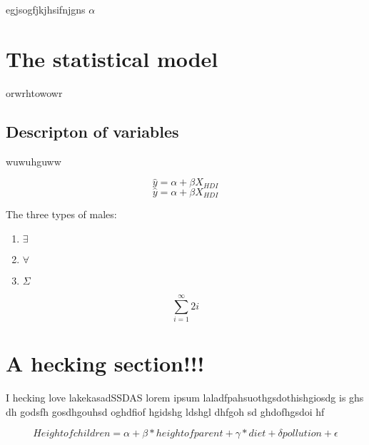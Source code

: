 \documentclass{article}
\begin{document}
egjsogfjkjhsifnjgns $\alpha$

\section{The statistical model}
orwrhtowowr
\subsection{Descripton of variables}
wuwuhguww

\begin{equation}
    \hat{y} = \alpha + \beta X_{HDI}
\end{equation}
$$\hat{y} = \alpha + \beta X_{HDI}$$

The three types of males:
\begin{enumerate}
    \item $\exists$
    \item $\forall$
    \item $\Sigma$
\end{enumerate}

$$\sum_{i=1} ^{\infty}{2i}$$
\section{A hecking section!!!}
I hecking love lakekasadSSDAS
lorem ipsum laladfpahsuothgsdothishgiosdg is ghs dh godsfh gosdhgouhsd oghdfiof hgidshg ldshgl dhfgoh sd ghdofhgsdoi hf


$$Height of children = \alpha + \beta *{height of parent} + \gamma *{diet} + \delta{pollution} + \epsilon$$
\end{document}
